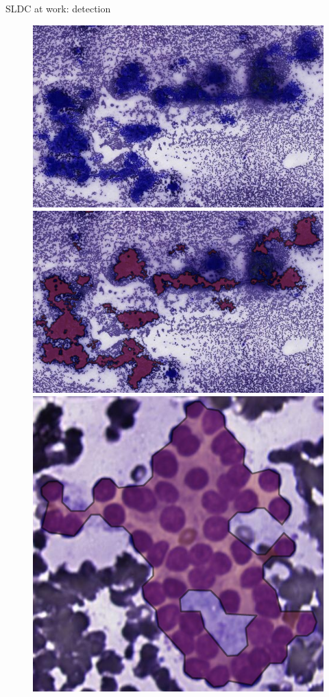 \documentclass{beamer}
\begin{document}
\begin{frame}{SLDC at work: detection}
	\begin{figure}
		\includegraphics[scale=0.3]{images/success_pattern_1_nopat.png}
		\hspace{0.25cm}
		\includegraphics[scale=0.3]{images/success_pattern_1_pat.png}\\
		\vspace{0.25cm}
		\includegraphics[scale=0.25]{images/success_reseg_2_pat.png}

\end{figure}
\end{frame}
\end{document}
